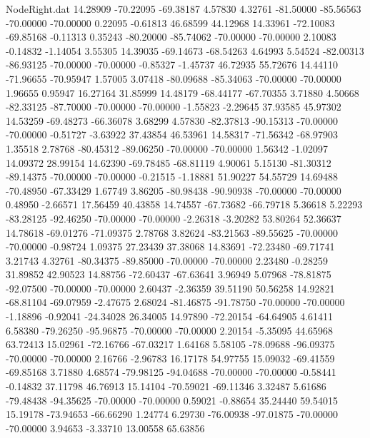 \begin{filecontents}{NodeRight.dat}
  14.28909  -70.22095  -69.38187     4.57830    4.32761  -81.50000  -85.56563  -70.00000  -70.00000    0.22095   -0.61813   46.68599   44.12968
  14.33961  -72.10083  -69.85168    -0.11313    0.35243  -80.20000  -85.74062  -70.00000  -70.00000    2.10083   -0.14832   -1.14054    3.55305
  14.39035  -69.14673  -68.54263     4.64993    5.54524  -82.00313  -86.93125  -70.00000  -70.00000   -0.85327   -1.45737   46.72935   55.72676
  14.44110  -71.96655  -70.95947     1.57005    3.07418  -80.09688  -85.34063  -70.00000  -70.00000    1.96655    0.95947   16.27164   31.85999
  14.48179  -68.44177  -67.70355     3.71880    4.50668  -82.33125  -87.70000  -70.00000  -70.00000   -1.55823   -2.29645   37.93585   45.97302
  14.53259  -69.48273  -66.36078     3.68299    4.57830  -82.37813  -90.15313  -70.00000  -70.00000   -0.51727   -3.63922   37.43854   46.53961
  14.58317  -71.56342  -68.97903     1.35518    2.78768  -80.45312  -89.06250  -70.00000  -70.00000    1.56342   -1.02097   14.09372   28.99154
  14.62390  -69.78485  -68.81119     4.90061    5.15130  -81.30312  -89.14375  -70.00000  -70.00000   -0.21515   -1.18881   51.90227   54.55729
  14.69488  -70.48950  -67.33429     1.67749    3.86205  -80.98438  -90.90938  -70.00000  -70.00000    0.48950   -2.66571   17.56459   40.43858
  14.74557  -67.73682  -66.79718     5.36618    5.22293  -83.28125  -92.46250  -70.00000  -70.00000   -2.26318   -3.20282   53.80264   52.36637
  14.78618  -69.01276  -71.09375     2.78768    3.82624  -83.21563  -89.55625  -70.00000  -70.00000   -0.98724    1.09375   27.23439   37.38068
  14.83691  -72.23480  -69.71741     3.21743    4.32761  -80.34375  -89.85000  -70.00000  -70.00000    2.23480   -0.28259   31.89852   42.90523
  14.88756  -72.60437  -67.63641     3.96949    5.07968  -78.81875  -92.07500  -70.00000  -70.00000    2.60437   -2.36359   39.51190   50.56258
  14.92821  -68.81104  -69.07959    -2.47675    2.68024  -81.46875  -91.78750  -70.00000  -70.00000   -1.18896   -0.92041  -24.34028   26.34005
  14.97890  -72.20154  -64.64905     4.61411    6.58380  -79.26250  -95.96875  -70.00000  -70.00000    2.20154   -5.35095   44.65968   63.72413
  15.02961  -72.16766  -67.03217     1.64168    5.58105  -78.09688  -96.09375  -70.00000  -70.00000    2.16766   -2.96783   16.17178   54.97755
  15.09032  -69.41559  -69.85168     3.71880    4.68574  -79.98125  -94.04688  -70.00000  -70.00000   -0.58441   -0.14832   37.11798   46.76913
  15.14104  -70.59021  -69.11346     3.32487    5.61686  -79.48438  -94.35625  -70.00000  -70.00000    0.59021   -0.88654   35.24440   59.54015
  15.19178  -73.94653  -66.66290     1.24774    6.29730  -76.00938  -97.01875  -70.00000  -70.00000    3.94653   -3.33710   13.00558   65.63856

\end{filecontents}
